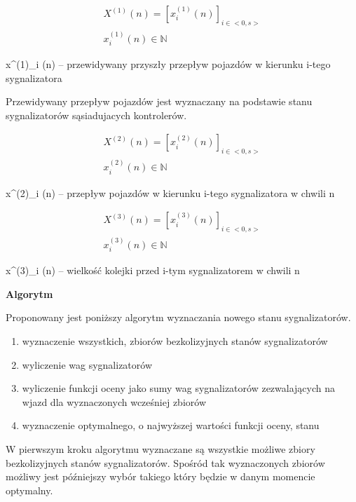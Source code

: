 \begin{equation}
	\begin{array}{c}
		X^{(1)} (n) = \left[ x^{(1)}_{i} (n) \right]_{i \in <0,s>}\\
		x^{(1)}_{i} (n) \in \mathbb{N}
	\end{array}
\end{equation}

x^{(1)}_{i} (n) \textrm{ -- przewidywany przyszły przepływ pojazdów w kierunku i-tego sygnalizatora}

Przewidywany przepływ pojazdów jest wyznaczany na podstawie stanu sygnalizatorów sąsiadujacych kontrolerów.

\begin{equation}
	\begin{array}{c}
		X^{(2)} (n) = \left[ x^{(2)}_{i} (n) \right]_{i \in <0,s>}\\
		x^{(2)}_{i} (n) \in \mathbb{N}
	\end{array}
\end{equation}

x^{(2)}_{i} (n) \textrm{ -- przepływ pojazdów w kierunku i-tego sygnalizatora w chwili n}

\begin{equation}
	\begin{array}{c}
		X^{(3)} (n) = \left[ x^{(3)}_{i} (n) \right]_{i \in <0,s>}\\
		x^{(3)}_{i} (n) \in \mathbb{N}
	\end{array}
\end{equation}

x^{(3)}_{i} (n) \textrm{ -- wielkość kolejki przed i-tym sygnalizatorem w chwili n}

\vspace{1.5cm}
\textbf{Algorytm}

Proponowany jest poniższy algorytm wyznaczania nowego stanu sygnalizatorów.
\begin{enumerate}
	\item wyznaczenie wszystkich, zbiorów bezkolizyjnych stanów sygnalizatorów
	\item wyliczenie wag sygnalizatorów
	\item wyliczenie funkcji oceny jako sumy wag sygnalizatorów zezwalających na wjazd dla wyznaczonych wcześniej zbiorów
	\item wyznaczenie optymalnego, o najwyższej wartości funkcji oceny, stanu
\end{enumerate}

\vspace{0.5cm}
W pierwszym kroku algorytmu wyznaczane są wszystkie możliwe zbiory bezkolizyjnych stanów sygnalizatorów.
Spośród tak wyznaczonych zbiorów możliwy jest późniejszy wybór takiego który będzie w danym momencie optymalny.

